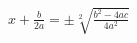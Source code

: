 \documentclass[preview]{standalone}
\begin{document}
\begin{align*}
x + \frac{b}{2 a} = \pm \sqrt[2]{\frac{{b}^{2} - 4 a c}{4 {a}^{2}}}
\end{align*}
\end{document}
